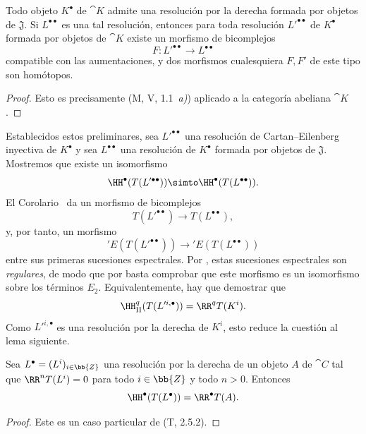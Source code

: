 \documentclass[oneside]{amsart}
\newcommand{\oldpage}[2][]{{\marginnote{\normalfont\textbf{#1}~|~#2}}\ignorespaces}
\let\EGAOriginalLabel\label
\renewcommand{\label}[1]{\phantomsection\EGAOriginalLabel{#1}}
\begin{document}
\begin{corollary}[11.5.2.2]
\label{0.11.5.2.2}
Todo objeto $K^\bullet$ de $\cat{K}$ admite una resolución por la derecha formada por objetos de $\mathfrak{J}$.
Si $L^{\bullet\bullet}$ es una tal resolución, entonces para toda resolución $L'^{\bullet\bullet}$ de $K^\bullet$ formada por objetos de $\cat{K}$ existe un morfismo de bicomplejos
\[
  F:L'^{\bullet\bullet}\longrightarrow L^{\bullet\bullet}
\]
compatible con las aumentaciones, y dos morfismos cualesquiera $F,F'$ de este tipo son homótopos.
\end{corollary}

\begin{proof}
Esto es precisamente (M, V, 1.1~\emph{a)}) aplicado a la categoría abeliana $\cat{K}$.
\end{proof}

\begin{env}[11.5.2.3]
\label{0.11.5.2.3}
Establecidos estos preliminares, sea $L'^{\bullet\bullet}$ una resolución de Cartan--Eilenberg inyectiva de $K^\bullet$ y sea $L^{\bullet\bullet}$ una resolución de $K^\bullet$ formada por objetos de $\mathfrak{J}$.
Mostremos que existe un isomorfismo
\[
  \HH^\bullet(T(L'^{\bullet\bullet}))
  \simto
  \HH^\bullet(T(L^{\bullet\bullet})).
\]
El Corolario~ da un morfismo de bicomplejos
\[
  T(L'^{\bullet\bullet})\longrightarrow T(L^{\bullet\bullet}),
\]
y, por tanto, un morfismo
\[
  'E(T(L'^{\bullet\bullet}))\longrightarrow{}'E(T(L^{\bullet\bullet}))
\]
entre sus primeras sucesiones espectrales.
Por , estas sucesiones espectrales son \emph{regulares}, de modo que por  basta comprobar que este morfismo es un isomorfismo sobre los términos $E_2$.
Equivalentemente, hay que demostrar que
\[
  \HH_\mathrm{II}^q(T(L'^{i,\bullet}))=\RR^qT(K^i).
\]
Como $L'^{i,\bullet}$ es una resolución por la derecha de $K^i$, esto reduce la cuestión al lema siguiente.
\end{env}

\oldpage[0\textsubscript{III}]{38}
\begin{lemma}[11.5.2.4]
\label{0.11.5.2.4}
Sea $L^\bullet=(L^i)_{i\in\bb{Z}}$ una resolución por la derecha de un objeto $A$ de $\cat{C}$ tal que $\RR^nT(L^i)=0$ para todo $i\in\bb{Z}$ y todo $n>0$.
Entonces
\[
  \HH^\bullet(T(L^\bullet))=\RR^\bullet T(A).
\]
\end{lemma}

\begin{proof}
Este es un caso particular de (T, 2.5.2).
\end{proof}
\end{document}
